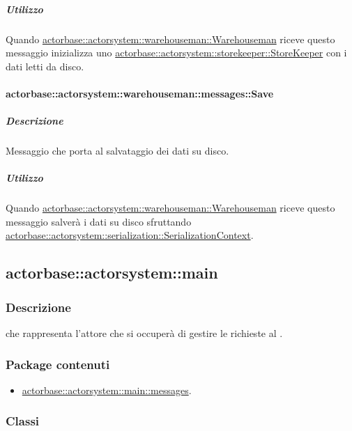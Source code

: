 \documentclass{scalatekids-article}
\begin{document}
\subparagraph{Utilizzo}

Quando \hyperref[sec:actorbase::actorsystem::warehouseman::Warehouseman]{actorbase::actorsystem::warehouseman::Warehouseman}
riceve questo messaggio inizializza uno \hyperref[sec:actorbase::actorsystem::storekeeper::StoreKeeper]{actorbase::actorsystem::storekeeper::StoreKeeper}
con i dati letti da disco.

\paragraph{actorbase::actorsystem::warehouseman::messages::Save}
\label{sec:actorbase::actorsystem::warehouseman::messages::Save}

\subparagraph{Descrizione}

Messaggio che porta al salvataggio dei dati su disco.

\subparagraph{Utilizzo}

Quando \hyperref[sec:actorbase::actorsystem::warehouseman::Warehouseman]{actorbase::actorsystem::warehouseman::Warehouseman}
riceve questo messaggio salverà i dati su disco sfruttando
\hyperref[sec:actorbase::actorsystem::serialization::SerializationContext]{actorbase::actorsystem::serialization::SerializationContext}.

\subsection{actorbase::actorsystem::main}
\label{sec:actorbase::actorsystem::main}

\subsubsection{Descrizione}

 che rappresenta l'attore che si occuperà di gestire le
richieste al .

\subsubsection{Package contenuti}

\begin{itemize}

\item \hyperref[sec:actorbase::actorsystem::main::messages]{actorbase::actorsystem::main::messages}.

\end{itemize}

\subsubsection{Classi}
\end{document}
